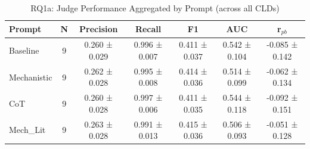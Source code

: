 \begin{table}[htbp]
\centering
\caption{RQ1a: Judge Performance Aggregated by Prompt (across all CLDs)}
\label{tab:rq1a_by_prompt}
\begin{tabular}{lcccccc}
\toprule
\textbf{Prompt} & \textbf{N} & \textbf{Precision} & \textbf{Recall} & \textbf{F1} & \textbf{AUC} & \textbf{r$_{pb}$} \\
\midrule
Baseline & 9 & 0.260 ± 0.029 & 0.996 ± 0.007 & 0.411 ± 0.037 & 0.542 ± 0.104 & -0.085 ± 0.142 \\
Mechanistic & 9 & 0.262 ± 0.028 & 0.995 ± 0.008 & 0.414 ± 0.036 & 0.514 ± 0.099 & -0.062 ± 0.134 \\
CoT & 9 & 0.260 ± 0.028 & 0.997 ± 0.006 & 0.411 ± 0.035 & 0.544 ± 0.118 & -0.092 ± 0.151 \\
Mech_Lit & 9 & 0.263 ± 0.028 & 0.991 ± 0.013 & 0.415 ± 0.036 & 0.506 ± 0.093 & -0.051 ± 0.128 \\
\bottomrule
\end{tabular}
\end{table}